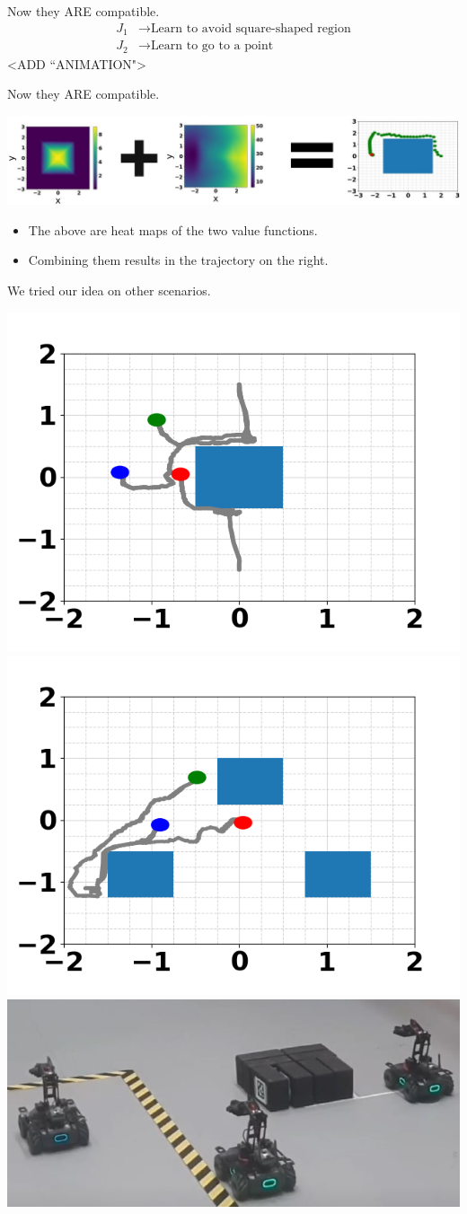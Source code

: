 \begin{frame}{Now they ARE compatible.}
	\begin{align*}
		{J}_1 &\rightarrow \textrm{Learn to avoid square-shaped region} \\
		{J}_2 &\rightarrow \textrm{Learn to go to a point}
	\end{align*}
	<ADD ``ANIMATION">
\end{frame}

\begin{frame}{Now they ARE compatible.}
	\begin{minipage}{\textwidth}
		\centering		
		\includegraphics[width=1.\linewidth]{diagramMath2}
	\end{minipage}%
	\seprule
	\begin{itemize}
		\item{The above are heat maps of the two value functions.}
		\item{Combining them results in the trajectory on the right.}
	\end{itemize}
\end{frame}

\begin{frame}{We tried our idea on other scenarios.}
	\begin{minipage}{\textwidth}
		\centering		
		\includegraphics[width=0.4\linewidth]{multRobotSim1}
		\includegraphics[width=0.4\linewidth]{multRobotSim2}
		\includegraphics[width=0.4\linewidth]{multiRobotRoboHub}
	\end{minipage}%
\end{frame}

